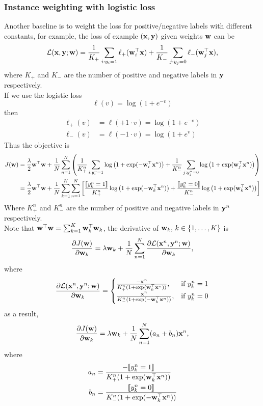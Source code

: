 \subsubsection{Instance weighting with logistic loss}
Another baseline is to weight the loss for positive/negative labels with different constants, for example,
the loss of example $(\mathbf{x}, \mathbf{y})$ given weights $\mathbf{w}$ can be
$$
\mathcal{L}(\mathbf{x}, \mathbf{y}; \mathbf{w}) = \frac{1}{K_+} \sum_{i:y_i=1} \ell_+(\mathbf{w}_i^\top \mathbf{x}) + \frac{1}{K_-} \sum_{j:y_j=0} \ell_-(\mathbf{w}_j^\top \mathbf{x}),
$$
where $K_+$ and $K_-$ are the number of positive and negative labels in $\mathbf{y}$ respectively. \\
If we use the logistic loss 
$$
\ell(v) = \log(1 + e^{-v})
$$
then
\begin{align*}
\ell_+(v) &= \ell(+1 \cdot v) = \log(1 + e^{-v}) \\
\ell_-(v) &= \ell(-1 \cdot v) = \log(1 + e^v)
\end{align*}
Thus the objective is
\begin{align*}
J(\mathbf{w}) 
&= \frac{\lambda}{2} \mathbf{w}^\top \mathbf{w} + \frac{1}{N} \sum_{n=1}^N \left(
   \frac{1}{K_+^n} \sum_{i:y_i^n=1} \log \left( 1 + \exp(-\mathbf{w}_i^\top \mathbf{x}^n) \right) + 
   \frac{1}{K_-^n} \sum_{j:y_j^n=0} \log \left( 1 + \exp(\mathbf{w}_j^\top \mathbf{x}^n) \right) \right) \\
&= \frac{\lambda}{2} \mathbf{w}^\top \mathbf{w} + \frac{1}{N} \sum_{k=1}^K \sum_{n=1}^N \left[
   \frac{\llbracket y_k^n = 1 \rrbracket}{K_+^n} \log \left( 1 + \exp(-\mathbf{w}_k^\top \mathbf{x}^n) \right) + 
   \frac{\llbracket y_k^n = 0 \rrbracket}{K_-^n} \log \left( 1 + \exp(\mathbf{w}_k^\top \mathbf{x}^n) \right) \right] 
\end{align*}
Where $K_+^n$ and $K_-^n$ are the number of positive and negative labels in $\mathbf{y}^n$ respectively. \\
Note that $\mathbf{w}^\top \mathbf{w} = \sum_{k=1}^K \mathbf{w}_k^\top \mathbf{w}_k$, the derivative of $\mathbf{w}_k, \, k \in \{1,\dots,K\}$ is
$$
\frac{\partial J(\mathbf{w})} {\partial \mathbf{w}_k} = \lambda \mathbf{w}_k + \frac{1}{N} \sum_{n=1}^N \frac{\partial \mathcal{L}(\mathbf{x}^n, \mathbf{y}^n; \mathbf{w})} {\partial \mathbf{w}_k},
$$
where 
$$
\frac{\partial \LCal(\x^n, \y^n; \w)} {\partial \w_k} =
\begin{cases}
\frac{-\x^n} {K_+^n (1 + \exp( \w_k^\top \x^n))}, & \text{if} \ y_k^n = 1 \\
\frac{ \x^n} {K_-^n (1 + \exp(-\w_k^\top \x^n))}, & \text{if} \ y_k^n = 0 \\
\end{cases}
$$
as a result,
$$
\frac{\partial J(\mathbf{w})} {\partial \mathbf{w}_k} = \lambda \mathbf{w}_k + \frac{1}{N} \sum_{n=1}^N (a_n + b_n) \mathbf{x}^n,
$$
where
\begin{align*}
a_n &= \frac{-\llbracket y_k^n = 1 \rrbracket} {K_+^n (1 + \exp( \mathbf{w}_k^\top \mathbf{x}^n))} \\
b_n &= \frac{ \llbracket y_k^n = 0 \rrbracket} {K_-^n (1 + \exp(-\mathbf{w}_k^\top \mathbf{x}^n))}
\end{align*}




